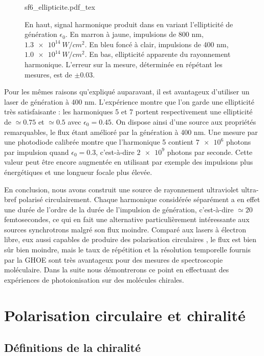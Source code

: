 \begin{figure}[!ht]
\centering
\def\svgwidth{1\columnwidth}
{sf6_ellipticite.pdf_tex}
\caption{En haut, signal harmonique produit dans  en variant l'ellipticité de génération $\epsilon_0$. En marron à jaune, impulsions de 800 nm, $\SI{1.3e14}{W/cm^2}$. En bleu foncé à clair, impulsions de 400 nm, $\SI{1.0e14}{W/cm^2}$. En bas, ellipticité apparente du rayonnement harmonique. L'erreur sur la mesure, déterminée en répétant les mesures, est de $\pm0.03$.}
\label{fig:sf6_ell}
\end{figure}

Pour les mêmes raisons qu'expliqué auparavant, il est avantageux d'utiliser un laser de génération à 400 nm. L'expérience montre que l'on garde une ellipticité très satisfaisante : les harmoniques 5 et 7 portent respectivement une ellipticité de $\simeq 0.75$ et $\simeq 0.5$ avec $\epsilon_0=0.45$. On dispose ainsi d'une source aux propriétés remarquables, le flux étant amélioré par la génération à 400 nm. Une mesure par une photodiode calibrée montre que l'harmonique 5 contient $\num{7e6}$ photons par impulsion quand $\epsilon_0=0.3$, c'est-à-dire $\num{2e9}$ photons par seconde. Cette valeur peut être encore augmentée en utilisant par exemple des impulsions plus énergétiques et une longueur focale plus élevée.

En conclusion, nous avons construit une source de rayonnement ultraviolet ultra-bref polarisé circulairement. Chaque harmonique considérée séparément a en effet une durée de l'ordre de la durée de l'impulsion de génération, c'est-à-dire $\simeq 20$ femtosecondes, ce qui en fait une alternative particulièrement intéressante aux sources synchrotrons malgré son flux moindre. Comparé aux lasers à électron libre, eux aussi capables de produire des polarisation circulaires , le flux est bien sûr bien moindre, mais le taux de répétition et la résolution temporelle fournis par la GHOE sont très avantageux pour des mesures de spectroscopie moléculaire. Dans la suite nous démontrerons ce point en effectuant des expériences de photoionisation sur des molécules chirales. 
%
\chapter{Polarisation circulaire et chiralité}
\section{Définitions de la chiralité}
